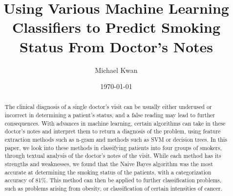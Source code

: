 \documentclass[12pt]{article}
\title{Using Various Machine Learning Classifiers to Predict Smoking Status From Doctor's Notes}
\author{Michael Kwan}
\date{\today}
\begin{document}
\maketitle
\begin{abstract}
The clinical diagnosis of a single doctor's visit can be usually either underused or incorrect in determining a patient's status, and a false reading may lead to further consequences. With advances in machine learning, certain algorithms can take in these doctor's notes and interpret them to return a diagnosis of the problem, using feature extraction methods such as n-gram and methods such as SVM or decision trees. In this paper, we look into these methods in classifying patients into four groups of smokers, through textual analysis of the doctor's notes of the visit. While each method has its strengths and weaknesses, we found that the Naive Bayes algorithm was the most accurate at determining the smoking status of the patients, with a categorization accuracy of 81\%. This method can then be applied to further classification problems, such as problems arising from obesity, or classification of certain intensities of cancer.
\end{abstract}
\end{document}
